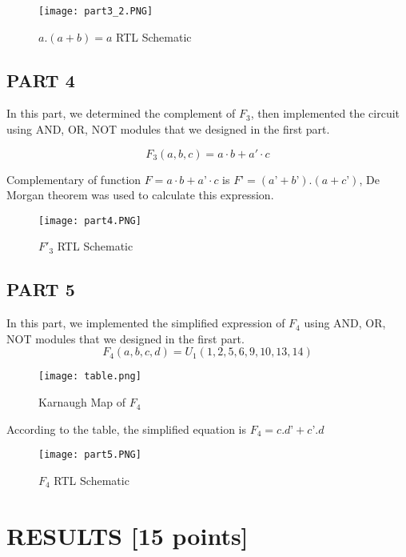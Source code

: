\documentclass[pdftex,12pt,a4paper]{article}
\begin{document}
\begin{figure}[ht]	
	\centering
	\texttt{[image: part3\_2.PNG]}	
	\caption{\( a . (a + b) = a\) RTL Schematic}
	\label{fig7}
\end{figure}


\clearpage

\subsection{PART 4}

In this part, we determined the complement of \(F_3\), then implemented the circuit using AND, OR, NOT modules that we designed in the first part. 

\[F_3(a, b, c) = a · b + a' · c \]

Complementary of function \(F = a · b + a’ · c\) is  \(F’ = (a’ + b’) . (a + c’)\), De Morgan theorem was used to calculate this expression.

\begin{figure}[ht]
	\centering
	\texttt{[image: part4.PNG]}	
	\caption{\(F'_3\) RTL Schematic}
	\label{fig9}
	
\end{figure}
\clearpage
\subsection{PART 5}

In this part, we implemented the simplified expression of  \(F_4\) using AND, OR, NOT modules that we designed in the first part. 
\[F_4(a,b,c,d) = U_1(1,2,5,6,9,10,13,14)\]

\begin{figure}[ht]
	\centering
	\texttt{[image: table.png]}	
	\caption{Karnaugh Map of \(F_4\)}
	\label{fig10}
	
\end{figure}

According to the table, the simplified equation is 
\(F_4 = c . d’ + c’ . d\)


\begin{figure}[ht]
	\centering
	\texttt{[image: part5.PNG]}	
	\caption{\(F_4\) RTL Schematic}
	\label{fig11}
	
\end{figure}

\clearpage

\section{RESULTS [15 points]}
\end{document}
